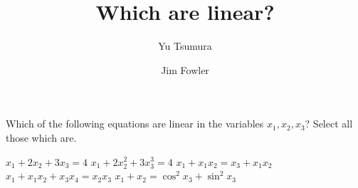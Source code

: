\documentclass{ximera}
\title{Which are linear?}
\author{Yu Tsumura \and Jim Fowler}
\begin{document}
\begin{problem}
  Which of the following equations are linear in the variables $x_1,x_2,x_3$?  Select all those which are.
  \begin{selectAll}
  \choice[correct] $x_1+2x_2+3x_3=4$
  \choice $x_1+2x_2^2+3x_3^3=4$
  \choice $x_1+x_1 x_2=x_3+x_1 x_2$
  \choice $x_1+x_1x_2+x_3x_4=x_2x_3$
  \choice[correct] $x_1+x_2=\cos^2 x_3+\sin^2 x_3$
\end{selectAll}

\end{problem}
	
\end{document}

